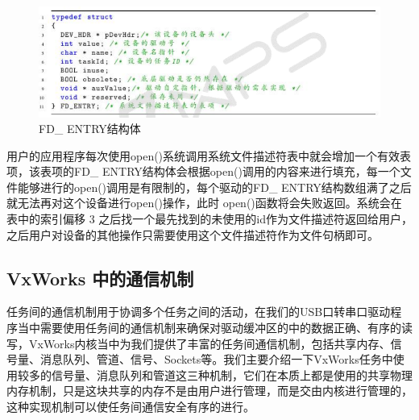 \begin{figure}[!h]
\centering
\includegraphics[width=1.0\textwidth]{./graphics/FDENTRY.pdf}
\caption{FD\_ ENTRY结构体}\label{fig:FDENTRY}
\end{figure}


用户的应用程序每次使用open()系统调用系统文件描述符表中就会增加一个有效表项，该表项的FD\_ ENTRY结构体会根据open()调用的内容来进行填充，每一个文件能够进行的open()调用是有限制的，每个驱动的FD\_ ENTRY结构数组满了之后就无法再对这个设备进行open()操作，此时 open()函数将会失败返回\cite{VxWorks内核解读}。系统会在表中的索引偏移 3 之后找一个最先找到的未使用的id作为文件描述符返回给用户，之后用户对设备的其他操作只需要使用这个文件描述符作为文件句柄即可。	
	
\subsection{VxWorks 中的通信机制}
	
	任务间的通信机制用于协调多个任务之间的活动，在我们的USB口转串口驱动程序当中需要使用任务间的通信机制来确保对驱动缓冲区的中的数据正确、有序的读写，VxWorks内核当中为我们提供了丰富的任务间通信机制，包括共享内存、信号量、消息队列、管道、信号、Sockets等。我们主要介绍一下VxWorks任务中使用较多的信号量、消息队列和管道这三种机制，它们在本质上都是使用的共享物理内存机制，只是这块共享的内存不是由用户进行管理，而是交由内核进行管理的，这种实现机制可以使任务间通信安全有序的进行\cite{胡明民2012基于实时操作系统}\cite{冯云贺2014基于}。

